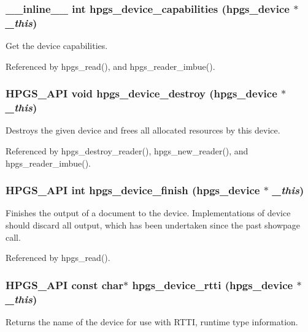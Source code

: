 \subsubsection[{hpgs\_\-device\_\-capabilities}]{\setlength{\rightskip}{0pt plus 5cm}\_\-\_\-inline\_\-\_\- int hpgs\_\-device\_\-capabilities ({\bf hpgs\_\-device} $\ast$ {\em \_\-this})\hspace{0.3cm}{\ttfamily  [static]}}\label{group__device_gaed7b6320c336ec035a00ea176329978f}
Get the device capabilities. 

Referenced by hpgs\_\-read(), and hpgs\_\-reader\_\-imbue().

\subsubsection[{hpgs\_\-device\_\-destroy}]{\setlength{\rightskip}{0pt plus 5cm}HPGS\_\-API void hpgs\_\-device\_\-destroy ({\bf hpgs\_\-device} $\ast$ {\em \_\-this})}\label{group__device_ga9e5033cc99679c854402df0157e0eb82}
Destroys the given device and frees all allocated resources by this device. 

Referenced by hpgs\_\-destroy\_\-reader(), hpgs\_\-new\_\-reader(), and hpgs\_\-reader\_\-imbue().

\subsubsection[{hpgs\_\-device\_\-finish}]{\setlength{\rightskip}{0pt plus 5cm}HPGS\_\-API int hpgs\_\-device\_\-finish ({\bf hpgs\_\-device} $\ast$ {\em \_\-this})}\label{group__device_ga070f7e3d2c775d37785462eb0424bf89}
Finishes the output of a document to the device. Implementations of device should discard all output, which has been undertaken since the past showpage call. 

Referenced by hpgs\_\-read().

\subsubsection[{hpgs\_\-device\_\-rtti}]{\setlength{\rightskip}{0pt plus 5cm}HPGS\_\-API const char$\ast$ hpgs\_\-device\_\-rtti ({\bf hpgs\_\-device} $\ast$ {\em \_\-this})}\label{group__device_ga629c2e61e8761371bc343ce2118797ca}
Returns the name of the device for use with RTTI, runtime type information. 
